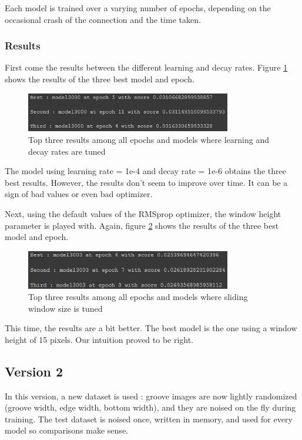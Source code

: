 \documentclass[12pt, twoside]{article}
\begin{document}
Each model is trained over a varying number of epochs, depending on the occasional crash of the connection and the time taken.
\subsubsection{Results}
First come the results between the different learning and decay rates. Figure \ref{resp2v1lr} shows the results of the three best model and epoch.
\begin{figure}
	\centering
	\includegraphics[width=0.8\textwidth]{../images/resp2v1lr.png}
	\caption{Top three results among all epochs and models where learning and decay rates are tuned}
	\label{resp2v1lr}
\end{figure}

The model using learning rate = 1e-4 and decay rate = 1e-6 obtains the three best results. However, the results don't seem to improve over time. It can be a sign of bad values or even bad optimizer. 

Next, using the default values of the RMSprop optimizer, the window height parameter is played with. Again, figure \ref{resp2v1ts} shows the results of the three best model and epoch.
\begin{figure}
	\centering
	\includegraphics[width=0.8\textwidth]{../images/resp2v1ts.png}
	\caption{Top three results among all epochs and models where sliding window size is tuned}
	\label{resp2v1ts}
\end{figure}

This time, the results are a bit better. The best model is the one using a window height of 15 pixels. Our intuition proved to be right.
\subsection{Version 2}
In this version, a new dataset is used : groove images are now lightly randomized (groove width, edge width, bottom width), and they are noised on the fly during training. The test dataset is noised once, written in memory, and used for every model so comparisons make sense.
\end{document}
